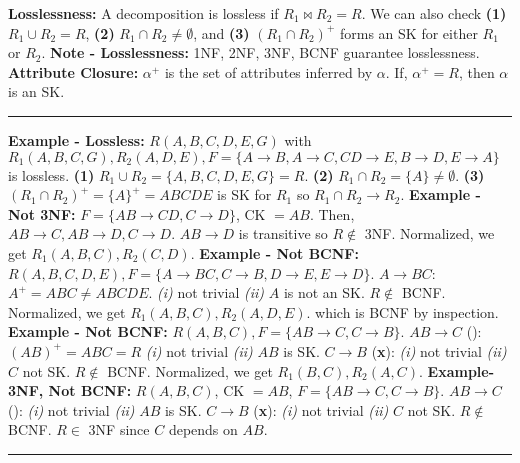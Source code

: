 \documentclass{report}
\renewcommand{\bf}[1]{\textbf{{#1}}}
\renewcommand{\it}[1]{\textit{{#1}}}
\begin{document}
\bf{Losslessness:} A decomposition is lossless if $R_1 \bowtie R_2 = R$. We can also check \bf{(1)}
$R_1 \cup R_2 = R$, \bf{(2)} $R_1 \cap R_2 \neq \emptyset$, and \bf{(3)} $(R_1 \cap R_2)^+$ forms an
SK for either $R_1$ or $R_2$. 
\hfil \newline
\bf{Note - Losslessness:} 1NF, 2NF, 3NF, BCNF guarantee losslessness.
\hfil \newline
\bf{Attribute Closure:} $\alpha^+$ is the set of attributes inferred by $\alpha$. If, $\alpha^+ =
R$, then $\alpha$ is an SK.
\hfil \newline
\vspace{-0.8em}
\hrule
\vspace{0.2em}

\bf{Example - Lossless:}
$R(A, B, C, D, E, G)$ with $R_1(A, B, C, G), R_2(A, D, E), F = \{A \to B, A \to C, CD \to E, B \to
D, E \to A\}$ is lossless.
\hfil \newline
\bf{(1)} $R_1 \cup R_2 = \{A, B, C, D, E, G\} = R$.
\bf{(2)} $R_1 \cap R_2 = \{A\} \neq \emptyset$.
\bf{(3)} $(R_1 \cap R_2)^+ = \{A\}^+ = ABCDE$ is SK for $R_1$ so $R_1 \cap R_2 \to R_2$.
\bf{Example - Not 3NF:} $F = \{AB \to CD, C \to D\}$, CK $= AB$. Then, $AB \to C, AB \to D, C \to
D$. $AB \to D$ is transitive so $R \not \in$ 3NF. Normalized, we get $R_1(A, B, C), R_2(C, D)$.
\hfil \newline
\bf{Example - Not BCNF:} $R(A, B, C, D, E), F = \{A \to BC, C \to B, D \to E, E \to D\}$.
$A \to BC$: $A^+ = ABC \neq ABCDE$. \it{(i)} not trivial \it{(ii)} $A$ is not an SK. $R \not
\in$ BCNF. Normalized, we get $R_1(A, B, C), R_2(A, D, E)$. which is BCNF by inspection.
\hfil \newline
\bf{Example - Not BCNF:} $R(A, B, C), F = \{AB \to C, C \to B\}$.
$AB \to C$ (\checkmark): $(AB)^+ = ABC = R$ \it{(i)} not trivial \it{(ii)} $AB$ is SK.
$C \to B$ (\bf{\textsf{x}}): \it{(i)} not trivial \it{(ii)} $C$ not SK. $R \not \in$ BCNF.
Normalized, we get $R_1(B, C), R_2 (A, C)$.
\hfil \newline
\bf{Example- 3NF, Not BCNF:} $R(A, B, C)$, CK $= AB$, $F = \{AB \to C, C \to B\}$.
$AB \to C$ (\checkmark): \it{(i)} not trivial \it{(ii)} $AB$ is SK.
$C \to B$ (\bf{\textsf{x}}): \it{(i)} not trivial \it{(ii)} $C$ not SK. $R \not \in$ BCNF. $R \in$
3NF since $C$ depends on $AB$.
\hfil \newline
\vspace{-0.8em}
\hrule
\vspace{0.2em}
\end{document}
